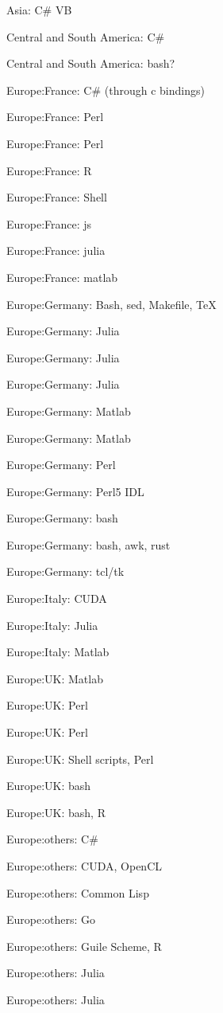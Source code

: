 \item Asia: C\# VB
\item Central and South America: C\#
\item Central and South America: bash?
\item Europe:France: C\# (through c bindings)
\item Europe:France: Perl
\item Europe:France: Perl
\item Europe:France: R
\item Europe:France: Shell
\item Europe:France: js
\item Europe:France: julia
\item Europe:France: matlab
\item Europe:Germany: Bash, sed, Makefile, TeX
\item Europe:Germany: Julia
\item Europe:Germany: Julia
\item Europe:Germany: Julia
\item Europe:Germany: Matlab
\item Europe:Germany: Matlab
\item Europe:Germany: Perl
\item Europe:Germany: Perl5 IDL
\item Europe:Germany: bash
\item Europe:Germany: bash, awk, rust
\item Europe:Germany: tcl/tk
\item Europe:Italy: CUDA
\item Europe:Italy: Julia
\item Europe:Italy: Matlab
\item Europe:UK: Matlab
\item Europe:UK: Perl
\item Europe:UK: Perl
\item Europe:UK: Shell scripts, Perl
\item Europe:UK: bash
\item Europe:UK: bash, R
\item Europe:others: C\#
\item Europe:others: CUDA, OpenCL
\item Europe:others: Common Lisp
\item Europe:others: Go
\item Europe:others: Guile Scheme, R
\item Europe:others: Julia
\item Europe:others: Julia
